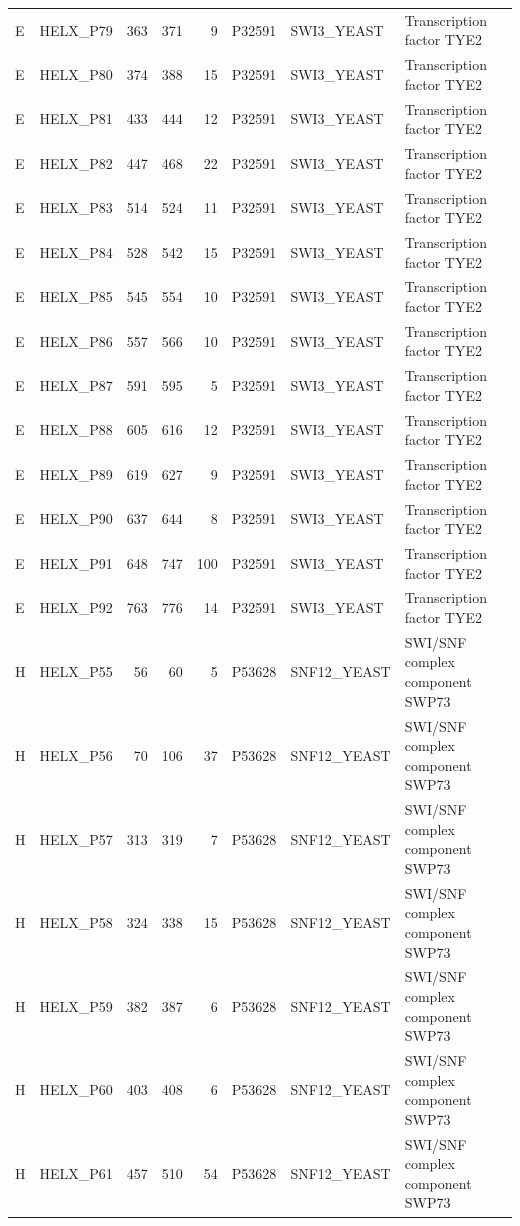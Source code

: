 \begin{longtable}{@{}llrrrrllp{5.2cm}@{}}
  E & HELX_P79 & 363 & 371 & 9 & P32591 & SWI3_YEAST & Transcription factor TYE2 \\
  E & HELX_P80 & 374 & 388 & 15 & P32591 & SWI3_YEAST & Transcription factor TYE2 \\
  E & HELX_P81 & 433 & 444 & 12 & P32591 & SWI3_YEAST & Transcription factor TYE2 \\
  E & HELX_P82 & 447 & 468 & 22 & P32591 & SWI3_YEAST & Transcription factor TYE2 \\
  E & HELX_P83 & 514 & 524 & 11 & P32591 & SWI3_YEAST & Transcription factor TYE2 \\
  E & HELX_P84 & 528 & 542 & 15 & P32591 & SWI3_YEAST & Transcription factor TYE2 \\
  E & HELX_P85 & 545 & 554 & 10 & P32591 & SWI3_YEAST & Transcription factor TYE2 \\
  E & HELX_P86 & 557 & 566 & 10 & P32591 & SWI3_YEAST & Transcription factor TYE2 \\
  E & HELX_P87 & 591 & 595 & 5 & P32591 & SWI3_YEAST & Transcription factor TYE2 \\
  E & HELX_P88 & 605 & 616 & 12 & P32591 & SWI3_YEAST & Transcription factor TYE2 \\
  E & HELX_P89 & 619 & 627 & 9 & P32591 & SWI3_YEAST & Transcription factor TYE2 \\
  E & HELX_P90 & 637 & 644 & 8 & P32591 & SWI3_YEAST & Transcription factor TYE2 \\
  E & HELX_P91 & 648 & 747 & 100 & P32591 & SWI3_YEAST & Transcription factor TYE2 \\
  E & HELX_P92 & 763 & 776 & 14 & P32591 & SWI3_YEAST & Transcription factor TYE2 \\
  H & HELX_P55 & 56 & 60 & 5 & P53628 & SNF12_YEAST & SWI/SNF complex component SWP73 \\
  H & HELX_P56 & 70 & 106 & 37 & P53628 & SNF12_YEAST & SWI/SNF complex component SWP73 \\
  H & HELX_P57 & 313 & 319 & 7 & P53628 & SNF12_YEAST & SWI/SNF complex component SWP73 \\
  H & HELX_P58 & 324 & 338 & 15 & P53628 & SNF12_YEAST & SWI/SNF complex component SWP73 \\
  H & HELX_P59 & 382 & 387 & 6 & P53628 & SNF12_YEAST & SWI/SNF complex component SWP73 \\
  H & HELX_P60 & 403 & 408 & 6 & P53628 & SNF12_YEAST & SWI/SNF complex component SWP73 \\
  H & HELX_P61 & 457 & 510 & 54 & P53628 & SNF12_YEAST & SWI/SNF complex component SWP73 \\

\end{longtable}
